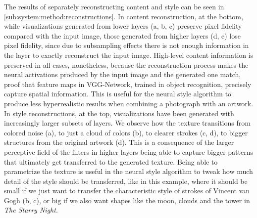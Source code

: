The results of separately reconstructing content and style can be seen in \autoref{sub:system:method:reconstructions}.
In content reconstruction, at the bottom, while visualizations generated from lower layers (a, b, c) preserve pixel fidelity compared with the input image, those generated from higher layers (d, e) lose pixel fidelity, since due to subsampling effects there is not enough information in the layer to exactly reconstruct the input image.
High-level content information is preserved in all cases, nonetheless, because the reconstruction process makes the neural activations produced by the input image and the generated one match, proof that feature maps in VGG-Network, trained in object recognition, precisely capture spatial information.
This is useful for the neural style algorithm to produce less hyperrealistic results when combining a photograph with an artwork.
In style reconstructions, at the top, visualizations have been generated with increasingly larger subsets of layers.
We observe how the texture transitions from colored noise (a), to just a cloud of colors (b), to clearer strokes (c, d), to bigger structures from the original artwork (d).
This is a consequence of the larger perceptive field of the filters in higher layers being able to capture bigger patterns that ultimately get transferred to the generated texture.
Being able to parametrize the texture is useful in the neural style algorithm to tweak how much detail of the style should be transferred, like in this example, where it should be small if we just want to transfer the characteristic style of strokes of Vincent van Gogh (b, c), or big if we also want shapes like the moon, clouds and the tower in \emph{The Starry Night}.

